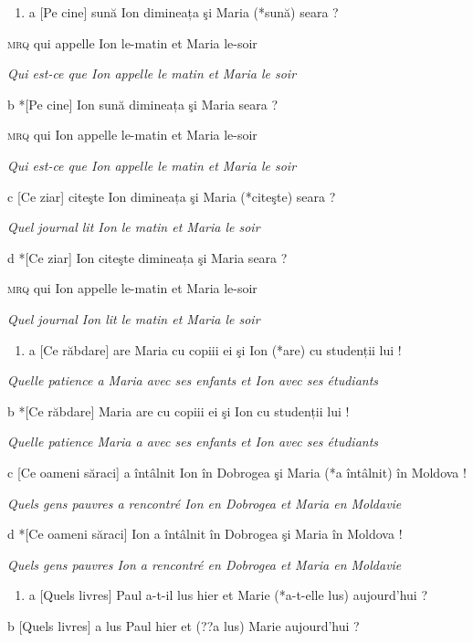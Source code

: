 \begin{enumerate}
\item \label{bkm:Ref299612187}a  [Pe cine] sună Ion dimineața şi Maria (*sună) seara ?


\end{enumerate}
  \textsc{mrq} qui appelle Ion le-matin et Maria le-soir 

{\itshape
Qui est-ce que Ion appelle le matin et Maria le soir   } 

  b  *[Pe cine] Ion sună dimineața şi Maria seara ?

    \textsc{mrq} qui Ion appelle le-matin et Maria le-soir

{\itshape
Qui est-ce que Ion appelle le matin et Maria le soir}

 c  [Ce ziar] citeşte Ion dimineața şi Maria (*citeşte) seara ? 

{\itshape
Quel journal lit Ion le matin et Maria le soir   } 

  d  *[Ce ziar] Ion citeşte dimineața şi Maria seara ?

    \textsc{mrq} qui Ion appelle le-matin et Maria le-soir

\textit{Quel journal Ion lit le matin et Maria le soir       }  


\begin{enumerate}
\item \label{bkm:Ref299612221}a  [Ce răbdare] are Maria cu copiii ei şi Ion (*are) cu studenții lui !


\end{enumerate}
{\itshape
Quelle patience a Maria avec ses enfants et Ion avec ses étudiants   } 

  b  *[Ce răbdare] Maria are cu copiii ei şi Ion cu studenții lui !

{\itshape
Quelle patience Maria a avec ses enfants et Ion avec ses étudiants   } 

  c  [Ce oameni săraci] a întâlnit Ion în Dobrogea şi Maria (*a întâlnit) în Moldova !

{\itshape
  Quels gens pauvres a rencontré Ion en Dobrogea et Maria en Moldavie}

  d  *[Ce oameni săraci] Ion a întâlnit în Dobrogea şi Maria în Moldova !

{\itshape
    Quels gens pauvres Ion a rencontré en Dobrogea et Maria en Moldavie}


\begin{enumerate}
\item \label{bkm:Ref299614058}a   [Quels livres] Paul a-t-il lus hier et Marie (*a-t-elle lus) aujourd'hui ? 


\end{enumerate}
  b  [Quels livres] a lus Paul hier et (??a lus) Marie aujourd'hui ?


